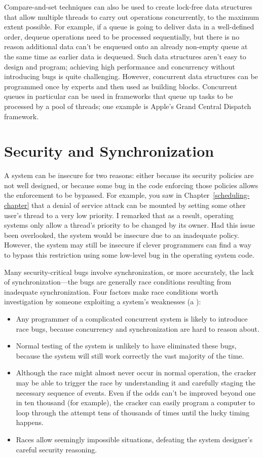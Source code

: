 Compare-and-set techniques can also be used to create lock-free data structures
that allow multiple threads to carry out operations concurrently, to
the maximum extent possible. For example, if a queue is going to
deliver data in a well-defined order, dequeue operations need to be
processed sequentially, but there is no reason additional data can't
be enqueued onto an already non-empty queue at the same time as
earlier data is dequeued. Such data structures aren't easy to design
and program; achieving high performance and concurrency without
introducing bugs is quite challenging.  However, concurrent data
structures can be programmed once by experts and then used as building
blocks.  Concurrent queues in particular can be used in frameworks
that queue up tasks to be processed by a pool of threads;
one example is Apple's Grand Central Dispatch framework.

\section{Security and Synchronization}\label{synchronization-and-security-section}

A system can be insecure for two reasons: either because its security
policies are not well designed, or because some bug in the code
enforcing those policies allows the enforcement to be bypassed.  For
example, you saw in Chapter~\ref{scheduling-chapter} that a denial of service
attack can be mounted by setting some other user's thread to a very
low priority.  I remarked that as a result, operating systems only
allow a thread's priority to be changed by its owner.  Had this issue
been overlooked, the system would be insecure due to an inadequate
policy.  However, the system may still be insecure if clever programmers
can find a way to bypass this restriction using some low-level bug in
the operating system code.

Many security-critical bugs involve synchronization, or more
accurately, the lack of synchronization---the bugs are generally race
conditions resulting from inadequate synchronization.  Four factors
make race conditions worth investigation by someone exploiting a system's weaknesses
(a ):
\begin{itemize}
\item
Any programmer of a complicated concurrent system is likely to introduce
race bugs, because concurrency and synchronization are hard to reason
about.
\item
Normal testing of the system is unlikely to have eliminated these bugs,
because the system will still work correctly the vast majority of the
time.
\item
Although the race might almost never occur in normal operation, the
cracker may be able to trigger the race by understanding it and
carefully staging the necessary sequence of events.  Even if the odds
can't be improved beyond one in ten thousand (for example), the
cracker can easily program a computer to loop through the attempt tens
of thousands of times until the lucky timing happens.
\item
Races allow seemingly impossible situations, defeating the system
designer's careful security reasoning.
\end{itemize}

